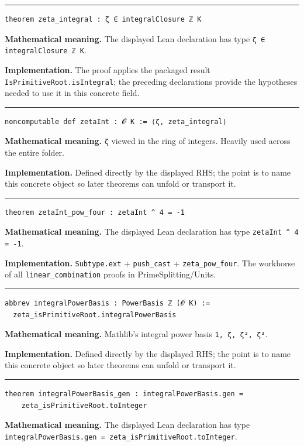 \documentclass[UTF8,a4paper,11pt,fontset=fandol]{ctexart}
\theoremstyle{definition}
\newcommand{\statementsep}{\par\medskip\hrule\medskip}
\begin{document}
\statementsep
\begin{verbatim}
theorem zeta_integral : ζ ∈ integralClosure ℤ K
\end{verbatim}
\noindent\textbf{Mathematical meaning.} The displayed Lean declaration has type \texttt{ζ ∈ integralClosure ℤ K}.\par
\noindent\textbf{Implementation.} The proof applies the packaged result \texttt{IsPrimitiveRoot.\allowbreak{}isIntegral}; the preceding declarations provide the hypotheses needed to use it in this concrete field.\par
\statementsep
\begin{verbatim}
noncomputable def zetaInt : 𝓞 K := ⟨ζ, zeta_integral⟩
\end{verbatim}
\noindent\textbf{Mathematical meaning.} \texttt{ζ} viewed in the ring of integers. Heavily used across the entire folder.\par
\noindent\textbf{Implementation.} Defined directly by the displayed RHS; the point is to name this concrete object so later theorems can unfold or transport it.\par
\statementsep
\begin{verbatim}
theorem zetaInt_pow_four : zetaInt ^ 4 = -1
\end{verbatim}
\noindent\textbf{Mathematical meaning.} The displayed Lean declaration has type \texttt{zetaInt \textasciicircum{} 4 = -1}.\par
\noindent\textbf{Implementation.} \texttt{Subtype.\allowbreak{}ext} + \texttt{push\_\allowbreak{}cast} + \texttt{zeta\_\allowbreak{}pow\_\allowbreak{}four}. The workhorse of all \texttt{linear\_\allowbreak{}combination} proofs in PrimeSplitting/Units.\par
\statementsep
\begin{verbatim}
abbrev integralPowerBasis : PowerBasis ℤ (𝓞 K) :=
  zeta_isPrimitiveRoot.integralPowerBasis
\end{verbatim}
\noindent\textbf{Mathematical meaning.} Mathlib's integral power basis \texttt{1, ζ, ζ², ζ³}.\par
\noindent\textbf{Implementation.} Defined directly by the displayed RHS; the point is to name this concrete object so later theorems can unfold or transport it.\par
\statementsep
\begin{verbatim}
theorem integralPowerBasis_gen : integralPowerBasis.gen =
    zeta_isPrimitiveRoot.toInteger
\end{verbatim}
\noindent\textbf{Mathematical meaning.} The displayed Lean declaration has type \texttt{integralPowerBasis.\allowbreak{}gen = zeta\_\allowbreak{}isPrimitiveRoot.\allowbreak{}toInteger}.\par
\end{document}
